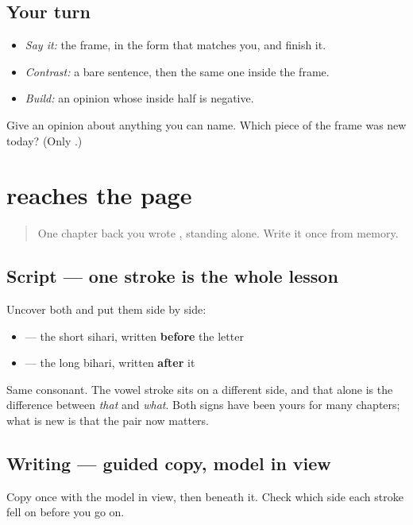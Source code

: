 \subsection*{Your turn}
\begin{itemize}
\raggedright
  \item \emph{Say it:} the frame, in the form that matches you, and finish it.
  \item \emph{Contrast:} a bare sentence, then the same one inside the frame.
  \item \emph{Build:} an opinion whose inside half is negative.
\end{itemize}

\begin{tcolorbox}[breakable,colback=teal!4,colframe=teal!35!black,title={Before you move on}]
Give an opinion about anything you can name. Which piece of the frame was new today? (Only \textbf{}.)
\end{tcolorbox}
\section[\texorpdfstring{\pa{ਕਿ} (ki)}{ਕਿ (ki)}]{ reaches the page}

\label{lesson:PA-C40-ki-write}



\begin{quote}
One chapter back you wrote \textbf{}, standing alone. Write it once from memory.
\end{quote}

\subsection*{Script — one stroke is the whole lesson}
Uncover both and put them side by side:

\begin{itemize}
\raggedright
  \item \textbf{} — the short \textbf{} sihari, written \textbf{before} the letter
  \item \textbf{} — the long \textbf{} bihari, written \textbf{after} it
\end{itemize}

Same consonant. The vowel stroke sits on a different side, and that alone is the difference between \emph{that} and \emph{what}. Both signs have been yours for many chapters; what is new is that the pair now matters.

\subsection*{Writing — guided copy, model in view}
Copy \textbf{} once with the model in view, then \textbf{} beneath it. Check which side each stroke fell on before you go on.

